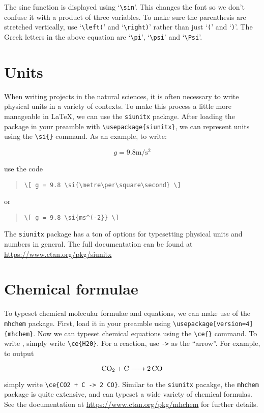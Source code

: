 \documentclass[a4paper,oneside]{memoir}
\begin{document}
The sine function is displayed using `\lstinline$\sin$'. This changes the font so we don't confuse it with a product of three variables. To make sure the parenthesis are stretched vertically, use `\lstinline$\left($' and `\lstinline$\right)$' rather than just `\texttt{(}' and `\texttt{)}'. The Greek letters in the above equation are `\lstinline$\pi$', `\lstinline$\psi$' and `\lstinline$\Psi$'.

\section{Units}
When writing projects in the natural sciences, it is often necessary to write physical units in a variety of contexts. To make this process a little more manageable in \LaTeX{}, we can use the \texttt{siunitx} package. After loading the package in your preamble with \lstinline$\usepackage{siunitx}$, we can represent units using the \lstinline$\si{}$ command. As an example, to write:

\[ g = 9.8 \si{\metre\per\square\second} \]

use the code

\begin{quote}
\begin{lstlisting}
\[ g = 9.8 \si{\metre\per\square\second} \]
\end{lstlisting}
\end{quote}

or

\begin{quote}
\begin{lstlisting}
\[ g = 9.8 \si{ms^(-2}} \]
\end{lstlisting}
\end{quote}

The \texttt{siunitx} package has a ton of options for typesetting physical units and numbers in general. The full documentation can be found at \url{https://www.ctan.org/pkg/siunitx}

\section{Chemical formulae}
To typeset chemical molecular formulae and equations, we can make use of the \texttt{mhchem} package. First, load it in your preamble using \lstinline$\usepackage[version=4]{mhchem}$. Now we can typeset chemical equations using the \lstinline$\ce{}$ command. To write , simply write \lstinline$\ce{H20}$. For a reaction, use \texttt{->} as the \enquote{arrow}. For example, to output

\[ \ce{CO2 + C -> 2 CO} \]

simply write \lstinline$\ce{CO2 + C -> 2 CO}$. Similar to the \texttt{siunitx} pacakge, the \texttt{mhchem} package is quite extensive, and can typeset a wide variety of chemical formulas. See the documentation at \url{https://www.ctan.org/pkg/mhchem} for further details.
\end{document}
